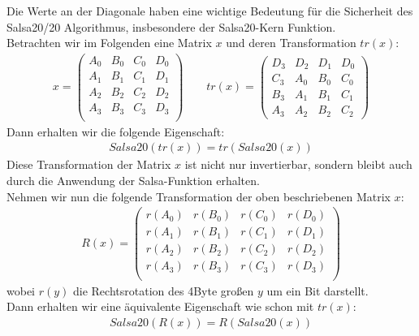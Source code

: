 \documentclass[course=erap]{aspdoc}
\begin{document}
Die Werte an der Diagonale haben eine wichtige Bedeutung für die Sicherheit des Salsa20/20 Algorithmus, insbesondere der Salsa20-Kern Funktion.
\vspace{1mm}
\\Betrachten wir im Folgenden eine Matrix $x$ und deren Transformation $tr(x)$:
\begin{gather*}
    x =
    \begin{pmatrix}
        A_0 & B_0 & C_0 & D_0 \\
        A_1 & B_1 & C_1 & D_1 \\
        A_2 & B_2 & C_2 & D_2 \\
        A_3 & B_3 & C_3 & D_3 \\
    \end{pmatrix}
    \quad \quad tr(x) =
    \begin{pmatrix}
        D_3 & D_2 & D_1 & D_0 \\
        C_3 & A_0 & B_0 & C_0 \\
        B_3 & A_1 & B_1 & C_1 \\
        A_3 & A_2 & B_2 & C_2
    \end{pmatrix}
\end{gather*}
Dann erhalten wir die folgende Eigenschaft:
\begin{gather*}
    Salsa20( tr(x) ) = tr( Salsa20(x) )
\end{gather*}
Diese Transformation der Matrix $x$ ist nicht nur invertierbar, sondern bleibt auch durch die Anwendung der Salsa-Funktion erhalten.\cite{salsa20security}
\vspace{1mm}
\\Nehmen wir nun die folgende Transformation der oben beschriebenen Matrix $x$:
\begin{gather*}
    R(x) =
    \begin{pmatrix}
        r(A_0) & r(B_0) & r(C_0) & r(D_0) \\
        r(A_1) & r(B_1) & r(C_1) & r(D_1) \\
        r(A_2) & r(B_2) & r(C_2) & r(D_2) \\
        r(A_3) & r(B_3) & r(C_3) & r(D_3) \\
    \end{pmatrix}
\end{gather*}
wobei $r(y)$ die Rechtsrotation des 4Byte großen $y$ um ein Bit darstellt.
\vspace{1mm}
\\Dann erhalten wir eine äquivalente Eigenschaft wie schon mit $tr(x)$:
\begin{gather*}
    Salsa20(R(x)) = R(Salsa20(x))
\end{gather*}
\end{document}
